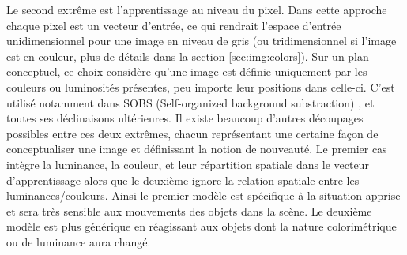 	Le second extrême est l'apprentissage au niveau du pixel. Dans cette approche chaque pixel est un vecteur d'entrée, ce qui rendrait l'espace d'entrée unidimensionnel pour une image en niveau de gris (ou tridimensionnel si l'image est en couleur, plus de détails dans la section \ref{sec:img:colors}). Sur un plan conceptuel, ce choix considère qu'une image est définie uniquement par les couleurs ou luminosités présentes, peu importe leur positions dans celle-ci. C'est utilisé notamment dans SOBS (Self-organized background substraction) \cite{maddalena2008self}, et toutes ses déclinaisons ultérieures. Il existe beaucoup d'autres découpages possibles entre ces deux extrêmes, chacun représentant une certaine façon de conceptualiser une image et définissant la notion de nouveauté. 
	Le premier cas intègre la luminance, la couleur, et leur répartition spatiale dans le vecteur d'apprentissage alors que le deuxième ignore la relation spatiale entre les luminances/couleurs. Ainsi le premier modèle est spécifique à la situation apprise et sera très sensible aux mouvements des objets dans la scène. Le deuxième modèle est plus générique en réagissant aux objets dont la nature colorimétrique ou de luminance aura changé.

